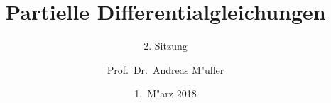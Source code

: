 \documentclass{beamer}
\title[]{Partielle Differentialgleichungen}
\subtitle{2. Sitzung}
\date[1.~M"arz 2018]{1.~M"arz 2018}
\author{Prof.~Dr.~Andreas M"uller}
\begin{document}
\begin{frame}
\titlepage
\end{frame}


\end{document}
